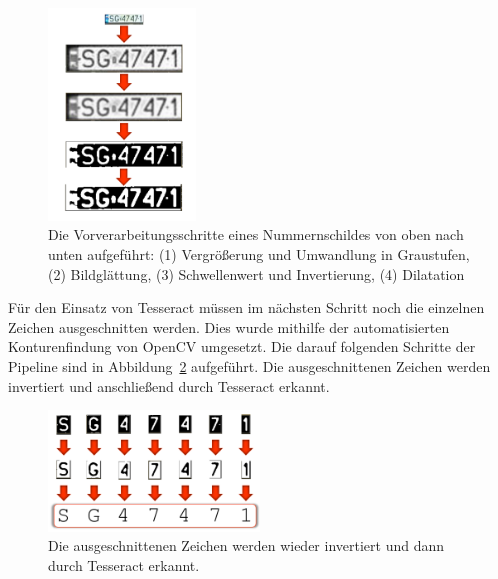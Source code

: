 \begin{figure}
    \centering
    \includegraphics[width=0.35\textwidth]{abbildungen/license_plate_preprocessing}
    \caption[Vorverarbeitung eines Nummernschildes]{Die Vorverarbeitungsschritte
    eines Nummernschildes von oben nach unten aufgef\"uhrt:
    (1) Vergr\"o{\ss}erung und Umwandlung in Graustufen,
    (2) Bildgl\"attung,
    (3) Schwellenwert und Invertierung,
    (4) Dilatation}
    \label{fig:license-plate-preprocessing}
\end{figure}

F\"ur den Einsatz von Tesseract m\"ussen im n\"achsten Schritt noch die
einzelnen Zeichen ausgeschnitten werden.
Dies wurde mithilfe der automatisierten Konturenfindung
von OpenCV umgesetzt.
Die darauf folgenden Schritte der Pipeline sind in
Abbildung~\ref{fig:character-preprocessing} aufgef\"uhrt.
Die ausgeschnittenen Zeichen werden invertiert und anschlie{\ss}end
durch Tesseract erkannt.

\begin{figure}
    \centering
    \includegraphics[width=0.5\textwidth]{abbildungen/character_preprocessing}
    \caption[Vorverarbeitung der einzelnen Zeichen]{Die ausgeschnittenen
        Zeichen werden wieder invertiert und dann durch
        Tesseract erkannt.}
    \label{fig:character-preprocessing}
\end{figure}